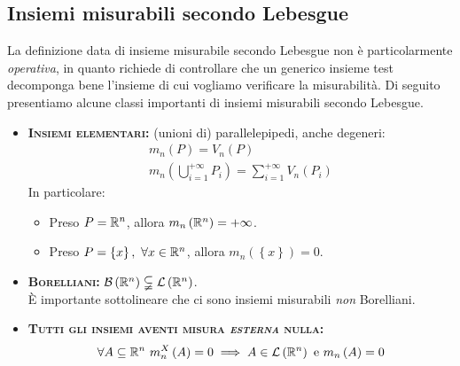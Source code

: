 \subsection{Insiemi misurabili secondo Lebesgue}
La definizione data di insieme misurabile secondo Lebesgue non è particolarmente \textit{operativa}, in quanto richiede di controllare che un generico insieme test decomponga bene l'insieme di cui vogliamo verificare la misurabilità.
Di seguito presentiamo alcune classi importanti di insiemi misurabili secondo Lebesgue.
\begin{itemize}
	\item \textsc{\textbf{Insiemi elementari:}} (unioni di) parallelepipedi, anche degeneri:
	\begin{gather*}
		m_n\left(P\right)=V_n\left(P\right)\\
		m_n\left(\bigcup_{i=1}^{+\infty} P_i\right)=\sum_{i=1}^{+\infty}V_n\left(P_i\right)
	\end{gather*}
In particolare:
\begin{itemize}
	\item Preso $P=\mathbb{R}^n$, allora $m_n\left(\mathbb{R}^n\right)=+\infty$.
	\item Preso $P=\left\{x\right\},\ \forall x\in\mathbb{R}^n$, allora $m_n\left(\left\{x\right\}\right)=0$.
\end{itemize}
\item \textsc{\textbf{Borelliani:}} $\mathcal{B}\left(\mathbb{R}^n\right)\subsetneqq\mathcal{L}\left(\mathbb{R}^n\right)$.\\
È importante sottolineare che ci sono insiemi misurabili \textit{non} Borelliani.
\item \textsc{\textbf{Tutti gli insiemi aventi misura \textit{esterna} nulla:}}
\begin{equation*}
	\forall A\subseteq \realset^n\ m_n^X\left(A\right)=0\implies A\in\mathcal{L}\left(\realset^n\right)\text{ e }m_n\left(A\right)=0
\end{equation*}
\end{itemize}

